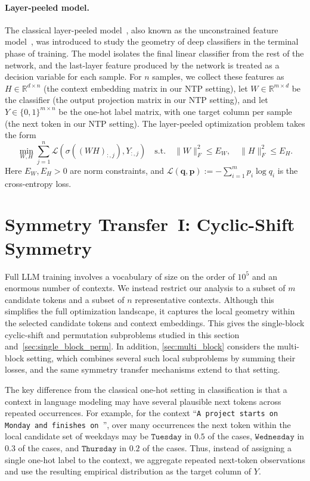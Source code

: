 \documentclass[11pt]{article}
\begin{document}
\paragraph{Layer-peeled model.}
The classical layer-peeled model~\citep{fang2021exploring}, also known as the unconstrained feature model~\citep{mixon2022neural}, was introduced to study the geometry of deep classifiers in the terminal phase of training. The model isolates the final linear classifier from the rest of the network, and the last-layer feature produced by the network is treated as a decision variable for each sample. For \(n\) samples, we collect these features as \(H\in\mathbb{R}^{d\times n}\) (the context embedding matrix in our NTP setting), let \(W\in\mathbb{R}^{m\times d}\) be the classifier (the output projection matrix in our NTP setting), and let \(Y\in\{0,1\}^{m\times n}\) be the one-hot label matrix, with one target column per sample (the next token in our NTP setting). The layer-peeled optimization problem takes the form
\[
\min_{W,H} 
\sum_{j=1}^{n}
\mathcal L\left(\sigma\left((WH)_{:,j}\right),Y_{:,j}\right) \quad
\mathrm{s.t.}\quad \|W\|_F^2\le E_W,\quad
\|H\|_F^2\le E_H .
\]
Here \(E_W,E_H>0\) are norm constraints, and \(\mathcal L(\boldsymbol q,\boldsymbol p):=-\sum_{i=1}^{m}p_i\log q_i\) is the cross-entropy loss.

\section{Symmetry Transfer~I: Cyclic-Shift Symmetry}\label{sec:single_block_cyclic}

Full LLM training involves a vocabulary of size on the order of \(10^5\) and an enormous number of contexts. We instead restrict our analysis to a subset of \(m\) candidate tokens and a subset of \(n\) representative contexts. Although this simplifies the full optimization landscape, it captures the local geometry within the selected candidate tokens and context embeddings. This gives the single-block cyclic-shift and permutation subproblems studied in this section and~\cref{sec:single_block_perm}. In addition, \cref{sec:multi_block} considers the multi-block setting, which combines several such local subproblems by summing their losses, and the same symmetry transfer mechanisms extend to that setting.

The key difference from the classical one-hot setting in classification is that a context in language modeling may have several plausible next tokens across repeated occurrences. For example, for the context ``\texttt{A project starts on Monday and finishes on \textvisiblespace}'', over many occurrences the next token within the local candidate set of weekdays may be \(\texttt{Tuesday}\) in \(0.5\) of the cases, \(\texttt{Wednesday}\) in \(0.3\) of the cases, and \(\texttt{Thursday}\) in \(0.2\) of the cases. Thus, instead of assigning a single one-hot label to the context, we aggregate repeated next-token observations and use the resulting empirical distribution as the target column of \(Y\).
\end{document}
